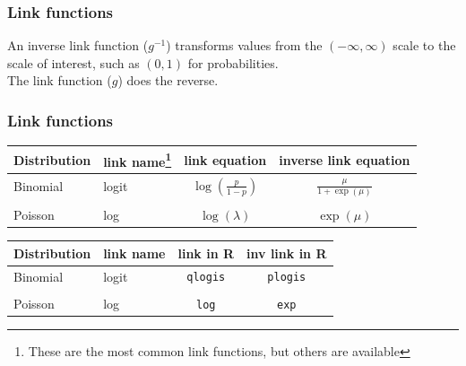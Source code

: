 \documentclass[color=usenames,dvipsnames]{beamer}\usepackage[]{graphicx}\usepackage[]{xcolor}
\begin{document}
\begin{frame}
  \frametitle{Link functions}
  An inverse link function ($g^{-1}$) transforms values from the $(-\infty,\infty)$
  scale to the scale of interest, such as $(0,1)$ for probabilities.  \\
  \pause
  \vfill
  The link function ($g$) does the reverse. \\
\end{frame}


\begin{frame}
  \frametitle{Link functions}
  \centering
  \begin{tabular}{llcc}
    \hline
    Distribution & link name\footnote{\scriptsize These are the most common link functions, but others are available} & link equation             & inverse link equation       \\
    \hline
    Binomial     & logit     & $\log(\frac{p}{1-p})$ & $\frac{\mu}{1 + \exp(\mu)}$                        \\
                 &           &                           &                             \\
    Poisson      & log       & $\log(\lambda)$               & $\exp(\mu)$  \\
    \hline
  \end{tabular}

\pause
\vfill

\begin{tabular}{llcc}
    \hline
    Distribution & link name & link in {\bf R}  & inv link in {\bf R}       \\
    \hline
    Binomial     & logit     & {\tt qlogis} & {\tt plogis}                        \\
                 &           &                           &                             \\
    Poisson      & log       & {\tt log}    & {\tt exp}  \\
    \hline
  \end{tabular}
\end{frame}
\end{document}
